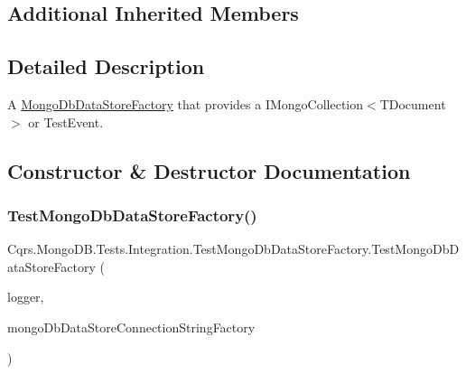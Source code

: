 \subsection*{Additional Inherited Members}


\subsection{Detailed Description}
A \hyperlink{classCqrs_1_1MongoDB_1_1Factories_1_1MongoDbDataStoreFactory_a5306704647ba6dab35844231ca999b7e_a5306704647ba6dab35844231ca999b7e}{Mongo\+Db\+Data\+Store\+Factory} that provides a I\+Mongo\+Collection$<$\+T\+Document$>$ or Test\+Event. 



\subsection{Constructor \& Destructor Documentation}
\mbox{\label{classCqrs_1_1MongoDB_1_1Tests_1_1Integration_1_1TestMongoDbDataStoreFactory_abb427efd7fcd28548fd02d09a2901994_abb427efd7fcd28548fd02d09a2901994}} 
\subsubsection{\texorpdfstring{Test\+Mongo\+Db\+Data\+Store\+Factory()}{TestMongoDbDataStoreFactory()}}
{\footnotesize\ttfamily Cqrs.\+Mongo\+D\+B.\+Tests.\+Integration.\+Test\+Mongo\+Db\+Data\+Store\+Factory.\+Test\+Mongo\+Db\+Data\+Store\+Factory (\begin{DoxyParamCaption}\item[{I\+Logger}]{logger,  }\item[{\hyperlink{interfaceCqrs_1_1MongoDB_1_1Factories_1_1IMongoDbDataStoreConnectionStringFactory}{I\+Mongo\+Db\+Data\+Store\+Connection\+String\+Factory}}]{mongo\+Db\+Data\+Store\+Connection\+String\+Factory }\end{DoxyParamCaption})}



